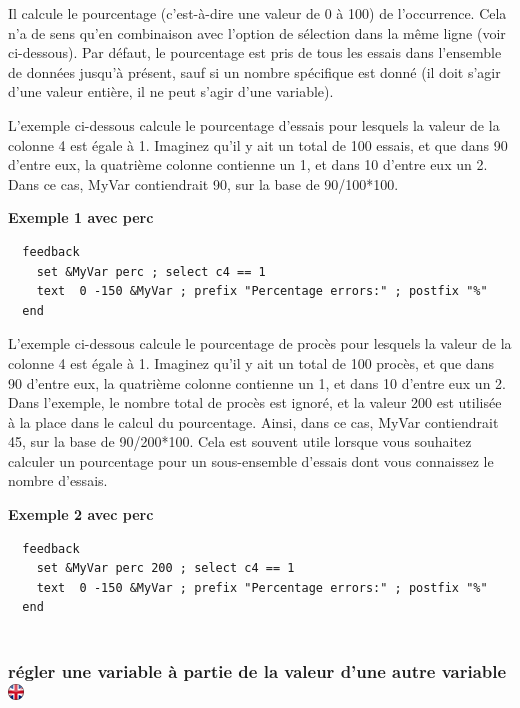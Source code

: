 \documentclass[
]{book}
\begin{document}
Il calcule le pourcentage (c'est-à-dire une valeur de 0 à 100) de l'occurrence. Cela n'a de sens qu'en combinaison avec l'option de sélection dans la même ligne (voir ci-dessous). Par défaut, le pourcentage est pris de tous les essais dans l'ensemble de données jusqu'à présent, sauf si un nombre spécifique est donné (il doit s'agir d'une valeur entière, il ne peut s'agir d'une variable).

L'exemple ci-dessous calcule le pourcentage d'essais pour lesquels la valeur de la colonne 4 est égale à 1. Imaginez qu'il y ait un total de 100 essais, et que dans 90 d'entre eux, la quatrième colonne contienne un 1, et dans 10 d'entre eux un 2. Dans ce cas, MyVar contiendrait 90, sur la base de 90/100*100.

\textbf{Exemple 1 avec perc}

\begin{verbatim}
  feedback
    set &MyVar perc ; select c4 == 1
    text  0 -150 &MyVar ; prefix "Percentage errors:" ; postfix "%"
  end
\end{verbatim}

L'exemple ci-dessous calcule le pourcentage de procès pour lesquels la valeur de la colonne 4 est égale à 1. Imaginez qu'il y ait un total de 100 procès, et que dans 90 d'entre eux, la quatrième colonne contienne un 1, et dans 10 d'entre eux un 2. Dans l'exemple, le nombre total de procès est ignoré, et la valeur 200 est utilisée à la place dans le calcul du pourcentage. Ainsi, dans ce cas, MyVar contiendrait 45, sur la base de 90/200*100. Cela est souvent utile lorsque vous souhaitez calculer un pourcentage pour un sous-ensemble d'essais dont vous connaissez le nombre d'essais.

\textbf{Exemple 2 avec perc}

\begin{verbatim}
  feedback
    set &MyVar perc 200 ; select c4 == 1
    text  0 -150 &MyVar ; prefix "Percentage errors:" ; postfix "%"
  end
  
\end{verbatim}

\hypertarget{ruxe9gler-une-variable-uxe0-partie-de-la-valeur-dune-autre-variable}{%
\subsubsection[régler une variable à partie de la valeur d'une autre variable ]{\texorpdfstring{régler une variable à partie de la valeur d'une autre variable \href{https://www.psytoolkit.org/doc3.1.0/feedback.html\#__just_set_a_variable_to_the_value_of_another_variable}{\protect\includegraphics{img/ukflag.png}}}{régler une variable à partie de la valeur d'une autre variable }}\label{ruxe9gler-une-variable-uxe0-partie-de-la-valeur-dune-autre-variable}}
\end{document}
